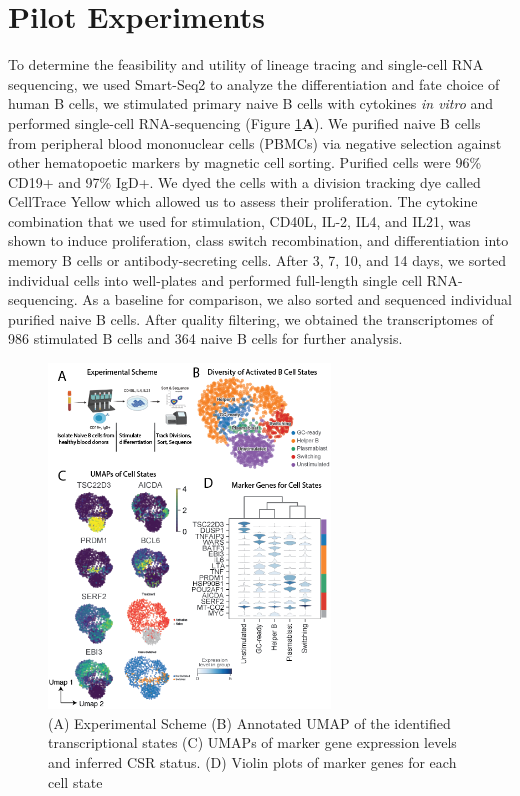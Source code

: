 \section{Pilot Experiments}

To determine the feasibility and utility of lineage tracing and single-cell RNA sequencing, we used Smart-Seq2 to analyze the differentiation and fate choice of human B cells, we stimulated primary naive B cells with cytokines \textit{in vitro} and performed single-cell RNA-sequencing  (Figure \ref{fig:paper2_prelimfig_1}\textbf{A}). We purified naive B cells from peripheral blood mononuclear cells (PBMCs) via negative selection against other hematopoetic markers by magnetic cell sorting. Purified cells were 96\% CD19+ and 97\% IgD+. We dyed the cells with a division tracking dye called CellTrace Yellow which allowed us to assess their proliferation. The cytokine combination that we used for stimulation, CD40L, IL-2, IL4, and IL21, was shown to induce proliferation, class switch recombination, and differentiation into memory B cells or antibody-secreting cells\cite{konforte_il-21_2009}. After 3, 7, 10, and 14 days, we sorted individual cells into well-plates and performed full-length single cell RNA-sequencing. As a baseline for comparison, we also sorted and sequenced individual purified naive B cells. After quality filtering, we obtained the transcriptomes of 986 stimulated B cells and 364 naive B cells for further analysis.
\begin{figure}[h!]
\centering
\includegraphics[width=7.5cm, keepaspectratio]{figs/prelim_InVitro/BCellLineagePaper_Figure 1.png}
\caption[Experimental overview and transcriptional data for Naive B cell activation]{(A) Experimental Scheme (B) Annotated UMAP of the identified transcriptional states (C) UMAPs of marker gene expression levels and inferred CSR status. (D) Violin plots of marker genes for each cell state}
\label{fig:paper2_prelimfig_1}
\end{figure}
